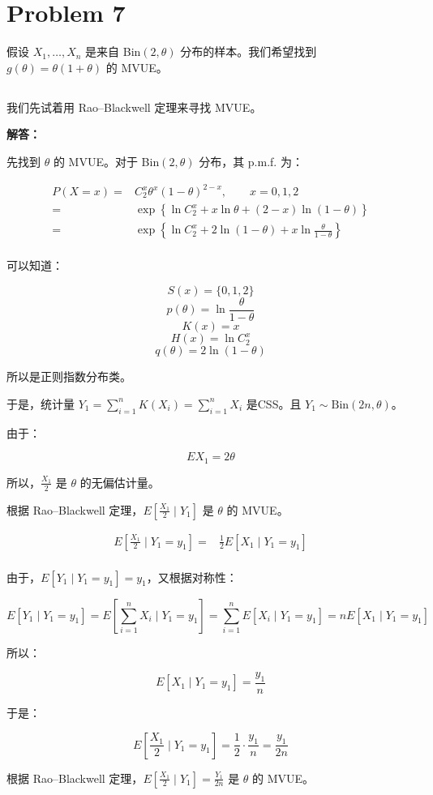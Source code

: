 \documentclass[12pt,a4paper]{article}
\begin{document}
\section{Problem 7}

假设 $X_1,\ldots,X_n$ 是来自 Bin$(2,\theta)$ 分布的样本。我们希望找到 $g(\theta)=\theta(1+\theta)$ 的 MVUE。

\subsection{}

我们先试着用 Rao--Blackwell 定理来寻找 MVUE。

\begin{answerbox}
\textbf{解答：}

先找到 $\theta$ 的 MVUE。对于 Bin$(2,\theta)$ 分布，其 p.m.f. 为：

$$
\begin{aligned}
P(X=x) =& C_2^x \theta^x (1-\theta)^{2-x},\qquad x=0,1,2 \\
=& \exp\left\{\ln C_2^x + x \ln \theta + (2-x) \ln (1-\theta)\right\} \\ 
=& \exp\left\{\ln C_2^x + 2 \ln (1-\theta) + x \ln \frac{\theta}{1-\theta}\right\} \\
\end{aligned}
$$

可以知道：

$$S(x) = \{0, 1, 2\}$$
$$p(\theta) = \ln \frac{\theta}{1-\theta}$$
$$K(x) = x$$
$$H(x) = \ln C_2^x$$
$$q(\theta) = 2\ln (1-\theta)$$

所以是正则指数分布类。

于是，统计量 $Y_1 = \sum_{i=1}^{n} K(X_i) = \sum_{i=1}^{n} X_i$ 是CSS。且 $Y_1 \sim \text{Bin}(2n, \theta)$。

由于：

$$
EX_1 = 2\theta
$$

所以，$\frac{X_1}{2}$ 是 $\theta$ 的无偏估计量。

根据 Rao--Blackwell 定理，$E\left[\frac{X_1}{2} \mid Y_1\right]$ 是 $\theta$ 的 MVUE。

$$
\begin{aligned}
E\left[\frac{X_1}{2} \mid Y_1 = y_1\right] =& \frac{1}{2} E\left[X_1 \mid Y_1 = y_1\right] \\
\end{aligned}
$$

由于，$E\left[Y_1 \mid Y_1 = y_1\right] =  y_1$，又根据对称性：

$$
E\left[Y_1 \mid Y_1 = y_1\right]  = E\left[\sum_{i=1}^{n}X_i \mid Y_1 = y_1\right] =\sum_{i=1}^{n} E\left[X_i \mid Y_1 = y_1\right] = n E\left[X_1 \mid Y_1 = y_1\right]
$$

所以：

$$
E\left[X_1 \mid Y_1 = y_1\right] = \frac{y_1}{n}
$$

于是：

$$
E\left[\frac{X_1}{2} \mid Y_1 = y_1\right] = \frac{1}{2} \cdot \frac{y_1}{n} = \frac{y_1}{2n}
$$

根据 Rao--Blackwell 定理，$E\left[\frac{X_1}{2} \mid Y_1\right] = \frac{Y_1}{2n}$ 是 $\theta$ 的 MVUE。

\end{answerbox}
\end{document}
